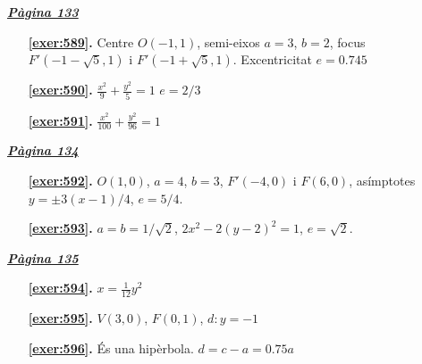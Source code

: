 
\hyperlink{page.133}{\textbf{\em Pàgina 133}}
\begin{enumerate}
\item[\fontfamily{phv}\selectfont\color{blue}\textbf{\ref{exer:589}. }] \label{ans:589} 
Centre $O(-1,1)$, semi-eixos $a=3$, $b=2$, focus $F'(-1-\sqrt {5}, 1)$ i $F'(-1+\sqrt {5}, 1)$. Excentricitat $e=0.745$
 \end{enumerate}
\begin{enumerate}
\item[\fontfamily{phv}\selectfont\color{blue}\textbf{\ref{exer:590}. }] \label{ans:590} 
$\frac {x^2}{9}+\frac {y^2}{5}=1$ $e=2/3$
\item[\fontfamily{phv}\selectfont\color{blue}\textbf{\ref{exer:591}. }] \label{ans:591} 
$\frac {x^2}{100}+\frac {y^2}{96}=1$
 \end{enumerate}
\vspace{0.3cm}


\hyperlink{page.134}{\textbf{\em Pàgina 134}}
\begin{enumerate}
\item[\fontfamily{phv}\selectfont\color{blue}\textbf{\ref{exer:592}. }] \label{ans:592} 
$O(1,0)$, $a=4$, $b=3$, $F'(-4,0)$ i $F(6,0)$, asímptotes $y=\pm 3(x-1)/4$, $e=5/4$.
 \end{enumerate}
\begin{enumerate}
\item[\fontfamily{phv}\selectfont\color{blue}\textbf{\ref{exer:593}. }] \label{ans:593} 
$a=b=1/\sqrt {2}$, $2{x^2}-2(y-2)^2=1$, $e=\sqrt {2}$.
 \end{enumerate}
\vspace{0.3cm}


\hyperlink{page.135}{\textbf{\em Pàgina 135}}
\begin{enumerate}
\item[\fontfamily{phv}\selectfont\color{blue}\textbf{\ref{exer:594}. }] \label{ans:594} 
$x=\frac {1}{12}y^2$
 \end{enumerate}
\begin{enumerate}
\item[\fontfamily{phv}\selectfont\color{blue}\textbf{\ref{exer:595}. }] \label{ans:595} 
$V(3,0)$, $F(0, 1)$, $d: y=-1$
\item[\fontfamily{phv}\selectfont\color{blue}\textbf{\ref{exer:596}. }] \label{ans:596} 
És una hipèrbola. $d=c-a=0.75 a$
 \end{enumerate}
\vspace{0.3cm}

